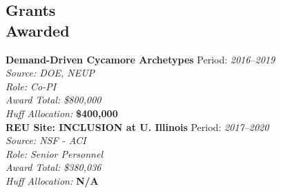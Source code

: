 \documentclass[margin,line]{resume}
\newcommand{\Cyclus}{\textsc{Cyclus}\xspace}%
\begin{document}
\begin{resume}
%
%
%
%
%
%
    \section{\mysidestyle Grants\\Awarded}
    \textbf{Demand-Driven Cycamore Archetypes} \hfill Period: 
    \textsl{2016--2019}\\
                \hfill \textsl{Source: DOE, NEUP}\\
                \hfill \textsl{Role: Co-PI}\\
                \hfill \textsl{Award Total: \$800,000}\\
                \hfill \textsl{Huff Allocation:} \textbf{\$400,000}\\
    \textbf{REU Site: INCLUSION at U. Illinois} \hfill Period: \textsl{2017--2020}\\
                \hfill \textsl{Source: NSF - ACI}\\
                \hfill \textsl{Role: Senior Personnel}\\
                \hfill \textsl{Award Total: \$380,036}\\
                \hfill \textsl{Huff Allocation:} \textbf{N/A}\\

\end{resume}
\end{document}
